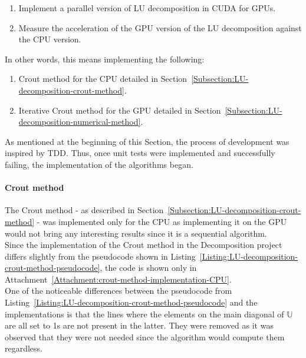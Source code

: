 \begin{enumerate}
	\item Implement a parallel version of LU decomposition in CUDA for GPUs.
	\item Measure the acceleration of the GPU version of the LU decomposition against the CPU version.
\end{enumerate}

In other words, this means implementing the following:

\begin{enumerate}
	\item Crout method for the CPU detailed in Section~\ref{Subsection:LU-decomposition-crout-method}.
	\item Iterative Crout method for the GPU detailed in Section~\ref{Subsection:LU-decomposition-numerical-method}.
\end{enumerate}

As mentioned at the beginning of this Section, the process of development was inspired by TDD. Thus, once unit tests were implemented and successfully failing, the implementation of the algorithms began.

\paragraph{Crout method}\label{Paragraph:implementation-decomposition-project-lu-decomposition-crout-method}
The Crout method - as described in Section~\ref{Subsection:LU-decomposition-crout-method} - was implemented only for the CPU as implementing it on the GPU would not bring any interesting results since it is a sequential algorithm. \\
Since the implementation of the Crout method in the Decomposition project differs slightly from the pseudocode shown in Listing~\ref{Listing:LU-decomposition-crout-method-pseudocode}, the code is shown only in Attachment~\ref{Attachment:crout-method-implementation-CPU}. \\
One of the noticeable differences between the pseudocode from Listing~\ref{Listing:LU-decomposition-crout-method-pseudocode} and the implementations is that the lines where the elements on the main diagonal of $ \mathbb{U} $ are all set to 1s are not present in the latter. They were removed as it was observed that they were not needed since the algorithm would compute them regardless.

